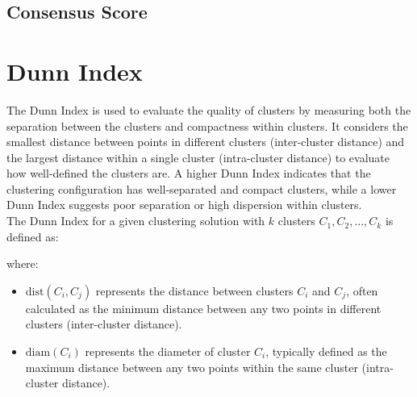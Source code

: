 \subsection{ Consensus Score}


\clearpage
\thispagestyle{clusteringstyle}
\section{ Dunn Index}


The Dunn Index is used to evaluate the quality of clusters by measuring both the separation between the clusters and compactness within clusters. It considers the smallest distance between points in different clusters (inter-cluster distance) and the largest distance within a single cluster (intra-cluster distance) to evaluate how well-defined the clusters are. A higher Dunn Index indicates that the clustering configuration has well-separated and compact clusters, while a lower Dunn Index suggests poor separation or high dispersion within clusters.\\

The Dunn Index for a given clustering solution with \( k \) clusters \( C_1, C_2, \ldots, C_k \) is defined as:

\begin{center}
\end{center}

where:
\begin{itemize}
	\item \(\text{dist}(C_i, C_j)\) represents the distance between clusters \( C_i \) and \( C_j \), often calculated as the minimum distance between any two points in different clusters (inter-cluster distance).
	\item \(\text{diam}(C_i)\) represents the diameter of cluster \( C_i \), typically defined as the maximum distance between any two points within the same cluster (intra-cluster distance).
\end{itemize}

